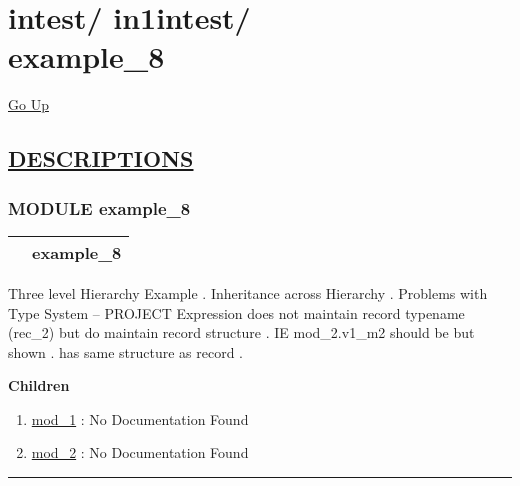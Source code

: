 \chapter*{\color{headfile}
{\large intest\slash\hspace{0pt}}
{\large in1intest\slash\hspace{0pt}}
 \\
example_8
}
\hypertarget{ecldoc:toc:intest.in1intest.example_8}{}
\hyperlink{ecldoc:toc:root/intest/in1intest}{Go Up}


\section*{\underline{\textsf{DESCRIPTIONS}}}
\subsection*{\textsf{\colorbox{headtoc}{\color{white} MODULE}
example\_8}}

\hypertarget{ecldoc:intest.in1intest.example_8}{}

{\renewcommand{\arraystretch}{1.5}
\begin{tabularx}{\textwidth}{|>{\raggedright\arraybackslash}l|X|}
\hline
\hspace{0pt}\mytexttt{\color{red} } & \textbf{example\_8} \\
\hline
\end{tabularx}
}

\par





Three level Hierarchy Example . Inheritance across Hierarchy . Problems with Type System -- PROJECT Expression does not maintain record typename (rec\_2) but do maintain record structure . IE mod\_2.v1\_m2 should be  but shown  .  has same structure as record  .







\textbf{Children}
\begin{enumerate}
\item \hyperlink{ecldoc:intest.in1intest.example_8.mod_1}{mod\_1}
: No Documentation Found
\item \hyperlink{ecldoc:intest.in1intest.example_8.mod_2}{mod\_2}
: No Documentation Found
\end{enumerate}

\rule{\linewidth}{0.5pt}

